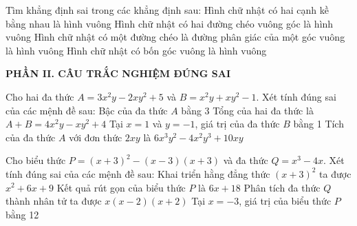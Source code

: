 \documentclass[12pt,a4paper]{article}
\begin{document}
\begin{ex}
Tìm khẳng định sai trong các khẳng định sau:
\choice
{Hình chữ nhật có hai cạnh kề bằng nhau là hình vuông}
{Hình chữ nhật có hai đường chéo vuông góc là hình vuông}
{Hình chữ nhật có một đường chéo là đường phân giác của một góc vuông là hình vuông}
{\True Hình chữ nhật có bốn góc vuông là hình vuông}
\end{ex}


\setcounter{ex}{0}
\noindent\textbf{\large PHẦN II. CÂU TRẮC NGHIỆM ĐÚNG SAI}
\vspace{1mm}
\begin{ex}
Cho hai đa thức $A = 3x^2y - 2xy^2 + 5$ và $B = x^2y + xy^2 - 1$. Xét tính đúng sai của các mệnh đề sau:
\choiceTF
{\True Bậc của đa thức $A$ bằng 3}
{\True Tổng của hai đa thức là $A + B = 4x^2y - xy^2 + 4$}
{Tại $x = 1$ và $y = -1$, giá trị của đa thức $B$ bằng 1}
{\True Tích của đa thức $A$ với đơn thức $2xy$ là $6x^3y^2 - 4x^2y^3 + 10xy$}
\end{ex}

\begin{ex}
Cho biểu thức $P = (x + 3)^2 - (x - 3)(x + 3)$ và đa thức $Q = x^3 - 4x$. Xét tính đúng sai của các mệnh đề sau:
\choiceTF
{\True Khai triển hằng đẳng thức $(x + 3)^2$ ta được $x^2 + 6x + 9$}
{\True Kết quả rút gọn của biểu thức $P$ là $6x + 18$}
{\True Phân tích đa thức $Q$ thành nhân tử ta được $x(x - 2)(x + 2)$}
{Tại $x = -3$, giá trị của biểu thức $P$ bằng 12}
\end{ex}
\end{document}
